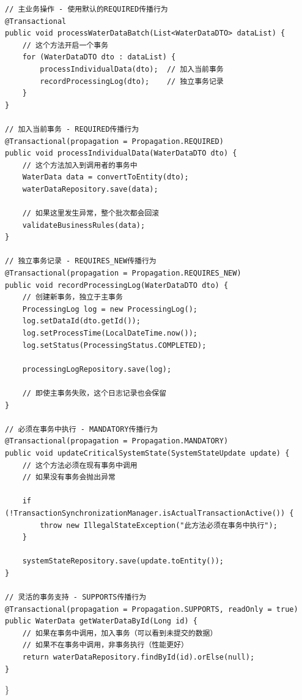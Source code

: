 \begin{verbatim}
// 主业务操作 - 使用默认的REQUIRED传播行为
@Transactional
public void processWaterDataBatch(List<WaterDataDTO> dataList) {
    // 这个方法开启一个事务
    for (WaterDataDTO dto : dataList) {
        processIndividualData(dto);  // 加入当前事务
        recordProcessingLog(dto);    // 独立事务记录
    }
}

// 加入当前事务 - REQUIRED传播行为
@Transactional(propagation = Propagation.REQUIRED)
public void processIndividualData(WaterDataDTO dto) {
    // 这个方法加入到调用者的事务中
    WaterData data = convertToEntity(dto);
    waterDataRepository.save(data);
    
    // 如果这里发生异常，整个批次都会回滚
    validateBusinessRules(data);
}

// 独立事务记录 - REQUIRES_NEW传播行为
@Transactional(propagation = Propagation.REQUIRES_NEW)
public void recordProcessingLog(WaterDataDTO dto) {
    // 创建新事务，独立于主事务
    ProcessingLog log = new ProcessingLog();
    log.setDataId(dto.getId());
    log.setProcessTime(LocalDateTime.now());
    log.setStatus(ProcessingStatus.COMPLETED);
    
    processingLogRepository.save(log);
    
    // 即使主事务失败，这个日志记录也会保留
}

// 必须在事务中执行 - MANDATORY传播行为
@Transactional(propagation = Propagation.MANDATORY)
public void updateCriticalSystemState(SystemStateUpdate update) {
    // 这个方法必须在现有事务中调用
    // 如果没有事务会抛出异常
    
    if (!TransactionSynchronizationManager.isActualTransactionActive()) {
        throw new IllegalStateException("此方法必须在事务中执行");
    }
    
    systemStateRepository.save(update.toEntity());
}

// 灵活的事务支持 - SUPPORTS传播行为
@Transactional(propagation = Propagation.SUPPORTS, readOnly = true)
public WaterData getWaterDataById(Long id) {
    // 如果在事务中调用，加入事务（可以看到未提交的数据）
    // 如果不在事务中调用，非事务执行（性能更好）
    return waterDataRepository.findById(id).orElse(null);
}
\end{verbatim}

\}

